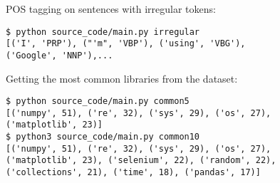 POS tagging on sentences with irregular tokens:

\begin{lstlisting}
$ python source_code/main.py irregular
[('I', 'PRP'), ("'m", 'VBP'), ('using', 'VBG'),
('Google', 'NNP'),...
\end{lstlisting}

Getting the most common libraries from the dataset:

\begin{lstlisting}
$ python source_code/main.py common5
[('numpy', 51), ('re', 32), ('sys', 29), ('os', 27),
('matplotlib', 23)]
$ python3 source_code/main.py common10
[('numpy', 51), ('re', 32), ('sys', 29), ('os', 27),
('matplotlib', 23), ('selenium', 22), ('random', 22),
('collections', 21), ('time', 18), ('pandas', 17)]
\end{lstlisting}